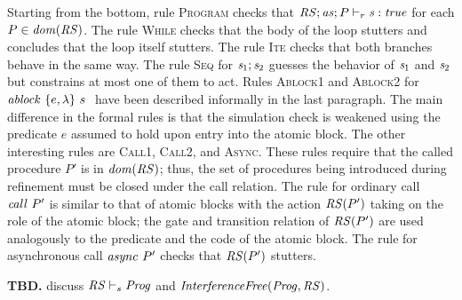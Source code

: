 Starting from the bottom, rule \textsc{Program} checks that $\mathit{RS};\mathit{as};P \vdash_r \mathit{s} : \mathit{true}$
for each $P \in \mathit{dom}(\mathit{RS})$.
The rule \textsc{While} checks that the body of the loop stutters and concludes that the loop itself stutters.
The rule \textsc{Ite} checks that both branches behave in the same way.
The rule \textsc{Seq} for $\mathit{s}_1;\mathit{s}_2$ guesses the behavior of $\mathit{s}_1$ and $\mathit{s}_2$ but constrains
at most one of them to act.
Rules \textsc{Ablock1} and \textsc{Ablock2} for $\mathit{ablock}\ {\{e,\lambda\}}\ {s}\ $ have been described informally in the last paragraph.  
The main difference in the formal rules is that the simulation check is weakened using the predicate $e$
assumed to hold upon entry into the atomic block.
The other interesting rules are \textsc{Call1}, \textsc{Call2}, and \textsc{Async}.
These rules require that the called procedure $P'$ is in $\mathit{dom}(\mathit{RS})$;
thus, the set of procedures being introduced during refinement must be closed under the call relation.
The rule for ordinary call $\mathit{call}\ P'$ is similar to that of atomic blocks with the action $\mathit{RS}(P')$
taking on the role of the atomic block;
the gate and transition relation of $\mathit{RS}(P')$ are used analogously to the predicate and the code of the atomic block.
The rule for asynchronous call $\mathit{async}\ P'$ checks that $\mathit{RS}(P')$ stutters.

{\bf TBD.} discuss $\mathit{RS} \vdash_s \mathit{Prog}$ and $\mathit{InterferenceFree}(\mathit{Prog},\mathit{RS})$.

